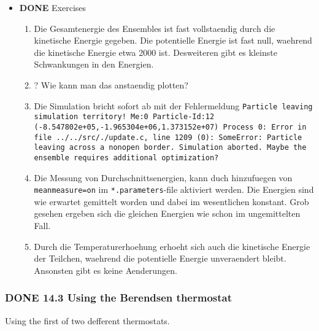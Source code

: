 \documentclass[11pt]{article}
\begin{document}
\begin{itemize}

\item \textbf{DONE} Exercises\\
\label{sec-2.4.2.1}

\begin{enumerate}
\item Die Gesamtenergie des Ensembles ist fast vollstaendig durch die kinetische Energie gegeben. Die potentielle Energie ist fast null, waehrend die kinetische Energie etwa 2000 ist. Desweiteren gibt es kleinste Schwankungen in den Energien.
\item ? Wie kann man das anstaendig plotten?
\item Die Simulation bricht sofort ab mit der Fehlermeldung \texttt{Particle leaving simulation territory! Me:0 Particle-Id:12 (-8.547802e+05,-1.965304e+06,1.373152e+07) Process 0: Error in file ../../src/./update.c, line 1209 (0): SomeError: Particle leaving across a nonopen border. Simulation aborted.  Maybe the ensemble requires additional optimization?}
\item Die Messung von Durchschnittsenergien, kann duch hinzufuegen von \texttt{meanmeasure=on} im \texttt{*.parameters}-file aktiviert werden. Die Energien sind wie erwartet gemittelt worden und dabei im wesentlichen konstant. Grob gesehen ergeben sich die gleichen Energien wie schon im ungemittelten Fall.
\item Durch die Temperaturerhoehung erhoeht sich auch die kinetische Energie der Teilchen, waehrend die potentielle Energie unveraendert bleibt. Ansonsten gibt es keine Aenderungen.
\end{enumerate}
\end{itemize} %
\subsubsection{\textbf{DONE} 14.3 Using the Berendsen thermostat}
\label{sec-2.4.3}

      Using the first of two defferent thermostats. 
\end{document}
